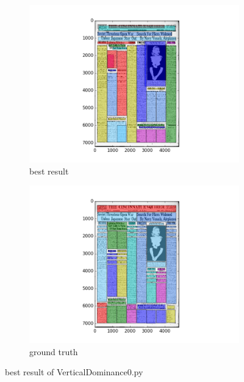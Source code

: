 \documentclass[a4paper,10pt]{article}
\begin{document}
					\begin{figure}
					\centering
					\begin{subfigure}{.5\textwidth}
					  \centering
					  \includegraphics[width=10cm]
					{VerticalDominance0.py.best.png}
					  \caption{best result}
					  \label{fig:sub1}
					\end{subfigure}%
					\begin{subfigure}{.5\textwidth}
					  \centering
					  \includegraphics[width=10cm]
					{VerticalDominance0.py.gt.best.png}
					  \caption{ground truth}
					  \label{fig:sub2}
					\end{subfigure}
					\caption
					{best result of VerticalDominance0.py}
					\label{fig:test}
					\end{figure}
					
\end{document}
